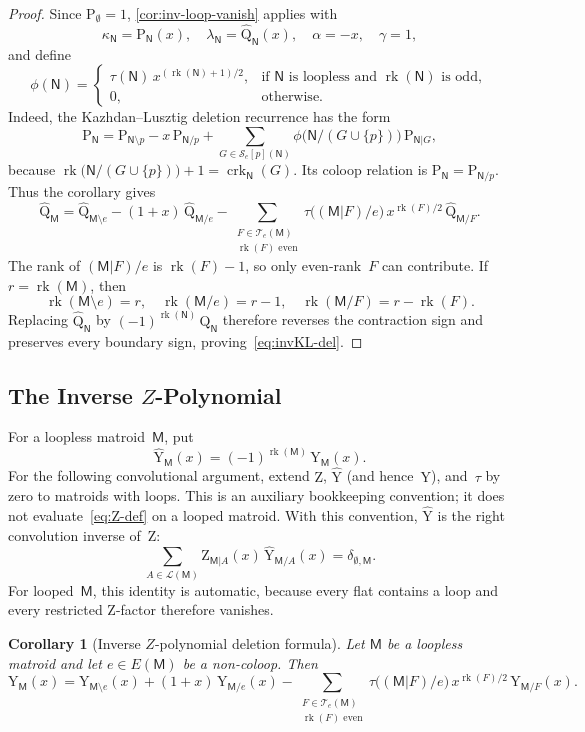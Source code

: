 \documentclass[12pt,letterpaper,english]{amsart}
\theoremstyle{teoremas}
\newtheorem{corollary}[theorem]{Corollary}
\theoremstyle{definition}
\DeclareMathOperator{\rk}{rk}
\DeclareMathOperator{\crk}{crk}
\newcommand{\M}{\mathsf{M}}
\newcommand{\N}{\mathsf{N}}
\newcommand{\PP}{\mathrm{P}}
\newcommand{\QQ}{\mathrm{Q}}
\newcommand{\YY}{\mathrm{Y}}
\newcommand{\ZP}{\mathrm{Z}} %
\newcommand{\Se}{\mathcal{S}_e}
\newcommand{\Te}{\mathcal{T}_e}
\begin{document}
\begin{proof}
Since $\PP_{\emptyset} = 1$, \cref{cor:inv-loop-vanish} applies with
\[
\kappa_{\N} = \PP_{\N}(x),\quad
\lambda_{\N} = \hat{\QQ}_{\N}(x),\quad
\alpha = -x,\quad
\gamma = 1,
\]
and define
\[
\phi(\N) =
\begin{cases}
\tau(\N)\, x^{(\rk(\N)+1)/2},
  & \text{if $\N$ is loopless and $\rk(\N)$ is odd},\\
0, & \text{otherwise}.
\end{cases}
\]
Indeed, the Kazhdan--Lusztig deletion recurrence has the form
\[
\PP_{\N} = \PP_{\N \setminus p} - x\, \PP_{\N/p}
  + \sum_{G \in \Se[p](\N)}
    \phi\bigl(\N/(G \cup \{p\})\bigr)\, \PP_{\N|G},
\]
because $\rk\bigl(\N/(G \cup \{p\})\bigr) + 1 = \crk_{\N}(G)$.
Its coloop relation is $\PP_{\N} = \PP_{\N/p}$.
Thus the corollary gives
\[
\hat{\QQ}_{\M} = \hat{\QQ}_{\M \setminus e}
  - (1+x)\, \hat{\QQ}_{\M/e}
  - \sum_{\substack{F \in \Te(\M) \\ \rk(F) \text{ even}}}
    \tau\bigl((\M|F)/e\bigr)\, x^{\rk(F)/2}\,
    \hat{\QQ}_{\M/F}.
\]
The rank of $(\M|F)/e$ is $\rk(F) - 1$, so only even-rank~$F$
can contribute.  If $r = \rk(\M)$, then
\[
\rk(\M \setminus e) = r,\quad
\rk(\M/e) = r-1,\quad
\rk(\M/F) = r - \rk(F).
\]
Replacing $\hat{\QQ}_{\N}$ by $(-1)^{\rk(\N)}\, \QQ_{\N}$ therefore
reverses the contraction sign and preserves every boundary sign,
proving~\eqref{eq:invKL-del}.
\end{proof}


\subsection{The Inverse $Z$-Polynomial}
For a loopless matroid~$\M$, put
\[
\hat{\YY}_{\M}(x) = (-1)^{\rk(\M)}\, \YY_{\M}(x).
\]
For the following convolutional argument, extend $\ZP$, $\hat{\YY}$
(and hence~$\YY$), and~$\tau$ by zero to matroids with loops.
This is an auxiliary bookkeeping convention; it does not
evaluate~\eqref{eq:Z-def} on a looped matroid.
With this convention, $\hat{\YY}$ is the right convolution inverse
of~$\ZP$:
\begin{equation}\label{eq:ZY-inv}
\sum_{A \in \mathcal{L}(\M)}
  \ZP_{\M|A}(x)\, \hat{\YY}_{\M/A}(x) = \delta_{\emptyset, \M}.
\end{equation}
For looped~$\M$, this identity is automatic, because every flat
contains a loop and every restricted $\ZP$-factor therefore vanishes.

\begin{corollary}[Inverse $Z$-polynomial deletion formula]
\label{cor:invZ-del}
Let $\M$ be a loopless matroid and let $e \in E(\M)$ be a non-coloop.
Then
\begin{equation}\label{eq:invZ-del}
\YY_{\M}(x) = \YY_{\M \setminus e}(x)
  + (1+x)\, \YY_{\M/e}(x)
  - \sum_{\substack{F \in \Te(\M) \\ \rk(F) \text{ even}}}
    \tau\bigl((\M|F)/e\bigr)\, x^{\rk(F)/2}\,
    \YY_{\M/F}(x).
\end{equation}
\end{corollary}
\end{document}
